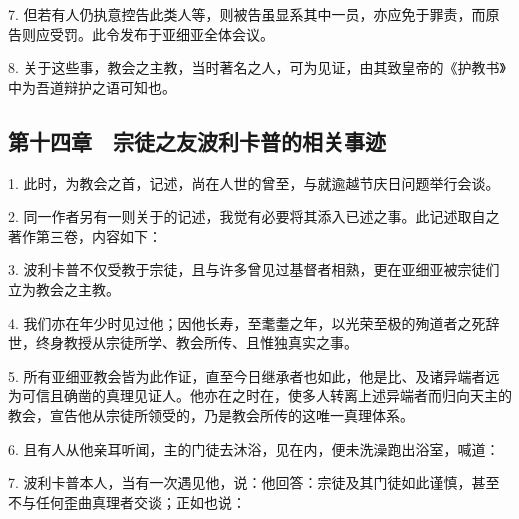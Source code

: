 7. 但若有人仍执意控告此类人等，则被告虽显系其中一员，亦应免于罪责，而原告则应受罚。此令发布于亚细亚全体会议。\par

8. 关于这些事，教会之主教，当时著名之人，可为见证，由其致皇帝的《护教书》中为吾道辩护之语可知也。\par


\subsection{第十四章　宗徒之友波利卡普的相关事迹}

1. 此时，为教会之首，记述，尚在人世的曾至，与就逾越节庆日问题举行会谈。\par

2. 同一作者另有一则关于的记述，我觉有必要将其添入已述之事。此记述取自之著作第三卷，内容如下：\par

3. 波利卡普不仅受教于宗徒，且与许多曾见过基督者相熟，更在亚细亚被宗徒们立为教会之主教。\par

4. 我们亦在年少时见过他；因他长寿，至耄耋之年，以光荣至极的殉道者之死辞世，终身教授从宗徒所学、教会所传、且惟独真实之事。\par

5. 所有亚细亚教会皆为此作证，直至今日继承者也如此，他是比、及诸异端者远为可信且确凿的真理见证人。他亦在之时在，使多人转离上述异端者而归向天主的教会，宣告他从宗徒所领受的，乃是教会所传的这唯一真理体系。\par

6. 且有人从他亲耳听闻，主的门徒去沐浴，见在内，便未洗澡跑出浴室，喊道：\par

7. 波利卡普本人，当有一次遇见他，说：他回答：宗徒及其门徒如此谨慎，甚至不与任何歪曲真理者交谈；正如也说： \par

